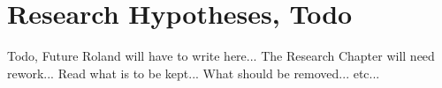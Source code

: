 
\section{Research Hypotheses, Todo}
Todo, Future Roland will have to write here...
The Research Chapter will need rework...
Read what is to be kept...
What should be removed...
etc...
